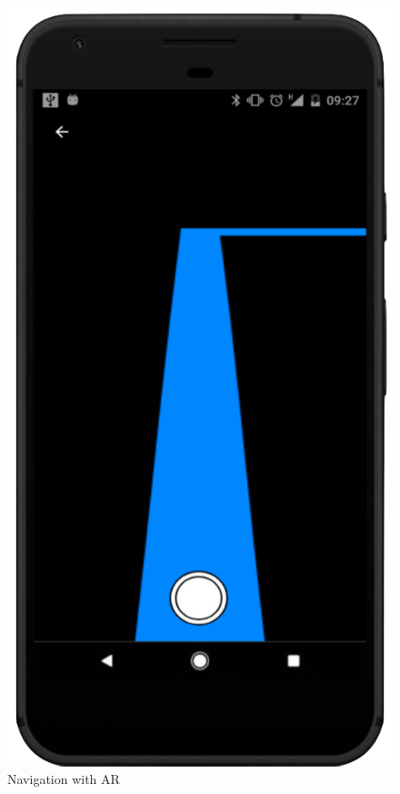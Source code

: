 \documentclass[compress]{beamer}
\begin{document}
\begin{frame}
\begin{figure}[!htb]
              \includegraphics[width=\linewidth]{4.png}
              \caption{\scriptsize Navigation with AR}
            \endminipage
            \end{figure}
	\end{frame}
\end{document}
